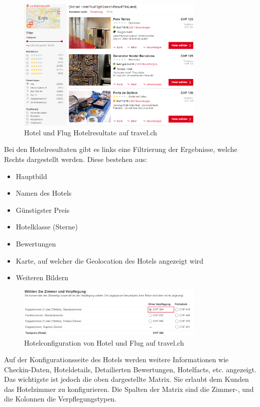 \begin{figure}[H]
	\centering
	\includegraphics[width=0.8\textwidth]{images/travel-results.png}
	\caption{Hotel und Flug Hotelresultate auf travel.ch}
	\label{fig:recherche:travelch:results}
\end{figure}
Bei den Hotelresultaten gibt es links eine Filtrierung der Ergebnisse, welche Rechts dargestellt werden. Diese bestehen aus:
\begin{itemize}
\item Hauptbild
\item Namen des Hotels
\item Günstigster Preis
\item Hotelklasse (Sterne)
\item Bewertungen
\item Karte, auf welcher die Geolocation des Hotels angezeigt wird
\item Weiteren Bildern
\end{itemize}

\begin{figure}[H]
	\centering
	\includegraphics[width=0.8\textwidth]{images/travel-configuration.png}
	\caption{Hotelconfiguration von Hotel und Flug auf travel.ch}
	\label{fig:recherche:travelch:configuration}
\end{figure}
Auf der Konfigurationsseite des Hotels werden weitere Informationen wie Checkin-Daten, Hoteldetails, Detailierten Bewertungen, Hotelfacts, etc. angezeigt. Das wichtigste ist jedoch die oben dargestellte Matrix. Sie erlaubt dem Kunden das Hotelzimmer zu konfigurieren. Die Spalten der Matrix sind die Zimmer-, und die Kolonnen die Verpflegungstypen.


